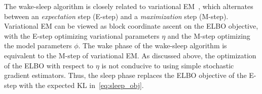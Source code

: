 The wake-sleep algorithm is closely related to variational EM~\citep{Jordan_intro_vi, neal2000varem, Beal2002varem}, 
which alternates between an {\itshape expectation} step (E-step) and a {\itshape maximization} step (M-step). 
Variational EM can be viewed as block coordinate ascent on the ELBO objective, with the E-step optimizing variational parameters $\eta$ and the M-step optimizing the model parameters $\phi$. 
The wake phase of the wake-sleep algorithm is equivalent to the M-step of variational EM. 
As discussed above, the optimization of the ELBO with respect to $\eta$ is not conducive to using simple stochastic gradient estimators.
Thus, the sleep phase replaces the ELBO objective of the E-step with the expected KL in~\eqref{eq:sleep_obj}.




